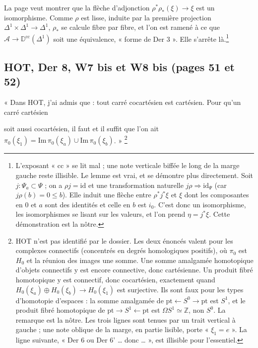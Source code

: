 \documentclass[11pt,a4paper]{article}
\begin{document}
La page veut montrer que la flèche d'adjonction $\rho^*\rho_*(\xi)
\to \xi$ est un isomorphisme. Comme $\rho$ est lisse, induite par la première
projection $\Delta^1 \times \Delta^1 \to \Delta^1$, $\rho_*$ se calcule fibre
par fibre, et l'on est ramené à ce que $\mathcal{A} \to \mathbb
D^{\mathrm{cc}}(\Delta^1)$ soit une équivalence, « forme de Der 3 ». Elle
s'arrête là.\footnote{L'exposant « cc » se lit mal ; une note verticale biffée
le long de la marge gauche reste illisible. Le lemme est vrai, et se démontre
plus directement. Soit $j : \Psi_a \subset \Psi$ ; on a $\rho j =
\mathrm{id}$ et une transformation naturelle $j\rho \Rightarrow
\mathrm{id}_\Psi$ (car $j\rho(b) = 0 \leq b$). Elle induit une flèche entre
$\rho^* j^*\xi$ et $\xi$ dont les composantes en $0$ et $a$ sont des identités
et celle en $b$ est $i_0$. C'est donc un isomorphisme, les isomorphismes se
lisant sur les valeurs, et l'on prend $\eta = j^*\xi$. Cette démonstration est
la nôtre.}

\subsection*{HOT, Der 8, W7 bis et W8 bis (pages 51 et 52)}

« Dans HOT, j'ai admis que : tout carré cocartésien est cartésien. Pour qu'un
carré cartésien


soit aussi cocartésien, il faut et il suffit que l'on ait
$\pi_0(\xi_1) = \mathrm{Im}\, \pi_0(\xi_a) \cup \mathrm{Im}\, \pi_0(\xi_b)$. »
\footnote{HOT n'est pas identifié par le dossier. Les deux énoncés valent pour
les complexes connectifs (concentrés en degrés homologiques positifs), où
$\pi_0$ est $H_0$ et la réunion des images une somme. Une somme amalgamée
homotopique d'objets connectifs y est encore connective, donc cartésienne. Un
produit fibré homotopique y est connectif, donc cocartésien, exactement quand
$H_0(\xi_a) \oplus H_0(\xi_b) \to H_0(\xi_1)$ est surjective. Ils sont faux
pour les types d'homotopie d'espaces : la somme amalgamée de $\mathrm{pt}
\leftarrow S^0 \to \mathrm{pt}$ est $S^1$, et le produit fibré homotopique de
$\mathrm{pt} \to S^1 \leftarrow \mathrm{pt}$ est $\Omega S^1 \simeq \mathbb Z$,
non $S^0$. La remarque est la nôtre. Les trois lignes sont tenues par un trait
vertical à gauche ; une note oblique de la marge, en partie lisible, porte
« $\xi_1 = e$ ». La ligne suivante, « Der 6 ou Der 6' … donc … », est
illisible pour l'essentiel.}
\end{document}
